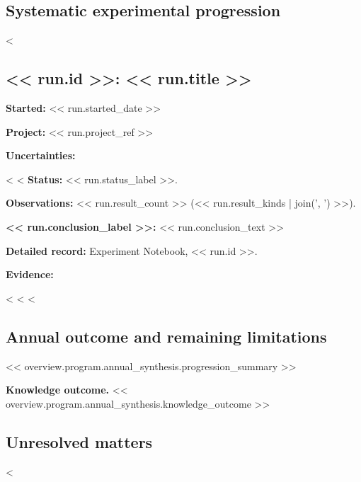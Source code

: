 \documentclass[11pt]{article}
\begin{document}
\begin{itemize}
\begin{itemize}
\begin{itemize}
\begin{itemize}
\begin{itemize}
\begin{itemize}
\begin{itemize}
\begin{itemize}
\section{Systematic experimental progression}
<%
\subsection{<< run.id >>: << run.title >>}
\textbf{Started:} << run.started_date >>

\textbf{Project:} << run.project_ref >>

\textbf{Uncertainties:}
\begin{itemize}
<%
<%
\textbf{Status:} << run.status_label >>.

\textbf{Observations:} << run.result_count >> (<< run.result_kinds | join(', ') >>).

\textbf{<< run.conclusion_label >>:} << run.conclusion_text >>

\textbf{Detailed record:} Experiment Notebook, << run.id >>.

\textbf{Evidence:}
\begin{itemize}
<%
<%
<%

\section{Annual outcome and remaining limitations}
<< overview.program.annual_synthesis.progression_summary >>

\textbf{Knowledge outcome.} << overview.program.annual_synthesis.knowledge_outcome >>
\subsection{Unresolved matters}\begin{itemize}<%

\end{itemize}
\end{itemize}
\end{itemize}
\end{itemize}
\end{itemize}
\end{itemize}
\end{itemize}
\end{itemize}
\end{itemize}
\end{itemize}
\end{itemize}
\end{document}
